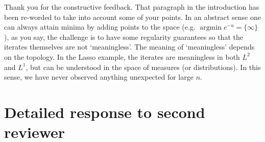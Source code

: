 \documentclass[12pt]{article}
\begin{document}
Thank you for the constructive feedback. That paragraph in the introduction has been re-worded to take into account some of your points. In an abstract sense one can always attain minima by adding points to the space (e.g. $\operatorname{argmin} e^{-u} = \{\infty\}$), as you say, the challenge is to have some regularity guarantees so that the iterates themselves are not `meaningless'. The meaning of `meaningless' depends on the topology. In the Lasso example, the iterates are meaningless in both $L^2$ and $L^1$, but can be understood in the space of measures (or distributions). In this sense, we have never observed anything unexpected for large $n$. 

\section{Detailed response to second reviewer}
\end{document}
